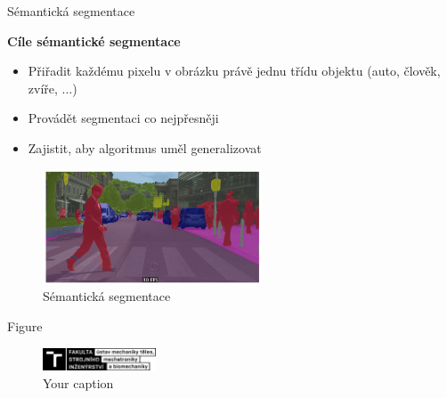 \documentclass[aspectratio=1610]{beamer}
\begin{document}
\begin{frame}{Sémantická segmentace}

\textbf{Cíle sémantické segmentace}
	\begin{itemize}
	\item Přiřadit každému pixelu v obrázku právě jednu třídu objektu (auto, člověk, zvíře, ...)
	\item Provádět segmentaci co nejpřesněji
	\item Zajistit, aby algoritmus uměl generalizovat
	\end{itemize}
		
	\begin{center}
		\begin{figure}
			\includegraphics[width=6.5cm]{semseg.jpg}	
			\caption{Sémantická segmentace}		
		\end{figure}	
	\end{center}
\end{frame}

\begin{frame}{Figure}
\begin{center}
\begin{figure}
\includegraphics[width=0.3\textwidth]{logo4.png}
\caption{Your caption}
\end{figure}
\end{center}
\end{frame}
\end{document}
